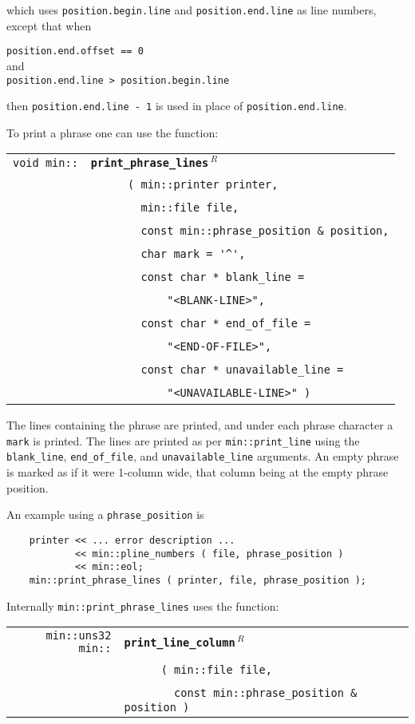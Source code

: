 \documentclass[12pt]{article}
\makeatletter
\newcommand{\ttindex}[1]{\index{#1@{\tt #1}}}
\newcommand{\minindex}[1]{\ttindex{min::#1}\ttindex{#1}}
\newcommand{\EOL}{\penalty \exhyphenpenalty}
\newenvironment{indpar}[1][0.3in]%
	{\begin{list}{}%
		     {\setlength{\itemsep}{0in}%
		      \setlength{\topsep}{0in}%
		      \setlength{\parsep}{1ex}%
		      \setlength{\labelwidth}{#1}%
		      \setlength{\leftmargin}{#1}%
		      \addtolength{\leftmargin}{\labelsep}}%
	 \item}%
	{\end{list}}
\newcommand{\LABEL}[1]{\label{#1}}
\newcommand{\ARGBREAK}{\\&{\tt ~~~~}}
\newcommand{\MINKEY}[1]{{\tt \bf #1}\minindex{#1}}
\newcommand{\REL}{$\,^R$}
\makeatother
\begin{document}
which uses {\tt position.begin.line} and
{\tt position.end.line} as
line numbers, except that when
\begin{center}
{\tt position.end.offset == 0} \\
and \\
{\tt position.end.line > position.begin.line}
\end{center}
then {\tt position.end.line - 1} is used in place of
{\tt position.end.line}.

To print a phrase one can use the function:

\begin{indpar}[1em]\begin{tabular}{r@{}l}
\verb|void min::|
    & \MINKEY{print\_\EOL phrase\_\EOL lines\REL}\ARGBREAK
      \verb| ( min::printer printer,|\ARGBREAK
      \verb|   min::file file,|\ARGBREAK
      \verb|   const min::phrase_position & position,|\ARGBREAK
      \verb|   char mark = '^',|\ARGBREAK
      \verb|   const char * blank_line =|\ARGBREAK
      \verb|       "<BLANK-LINE>",|\ARGBREAK
      \verb|   const char * end_of_file =|\ARGBREAK
      \verb|       "<END-OF-FILE>",|\ARGBREAK
      \verb|   const char * unavailable_line =|\ARGBREAK
      \verb|       "<UNAVAILABLE-LINE>" )|
\LABEL{MIN::PRINT_PHRASE_LINES} \\
\end{tabular}\end{indpar}

The lines containing the phrase are printed, and under each phrase
character a \verb|mark| is printed.  The lines are printed
as per {\tt min::\EOL print\_\EOL line} using the
{\tt blank\_\EOL line},
{\tt end\_\EOL of\_\EOL file}, and
{\tt unavailable\_\EOL line} arguments.
An empty phrase is marked as if it were 1-column wide, that column
being at the empty phrase position.

An example using a {\tt phrase\_position} is

\begin{indpar}\begin{verbatim}
    printer << ... error description ...
            << min::pline_numbers ( file, phrase_position )
            << min::eol;
    min::print_phrase_lines ( printer, file, phrase_position );
\end{verbatim}\end{indpar}

Internally {\tt min::\EOL print\_\EOL phrase\_\EOL lines}
uses the function:

\begin{indpar}[1em]\begin{tabular}{r@{}l}
\verb|min::uns32 min::|
    & \MINKEY{print\_\EOL line\_\EOL column\REL}\ARGBREAK
      \verb| ( min::file file,|\ARGBREAK
      \verb|   const min::phrase_position & position )|
\LABEL{MIN::PRINT_LINE_COLUMN} \\
\end{tabular}\end{indpar}
\end{document}
